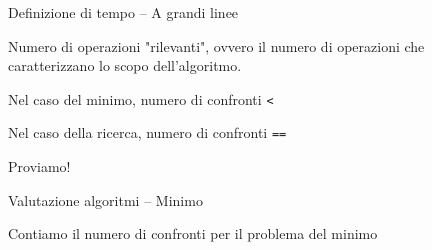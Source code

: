 \begin{frame}{Definizione di tempo -- A grandi linee}

\vspace{-9pt}
\begin{myboxtitle}
Numero di operazioni "rilevanti", ovvero il numero di operazioni che caratterizzano lo scopo dell'algoritmo.
\end{myboxtitle}

\begin{myboxtitle}[Esempio]
\BIL
\item Nel caso del minimo, numero di confronti \texttt{<}
\item Nel caso della ricerca, numero di confronti \texttt{==}
\EIL
\end{myboxtitle}

\begin{mybox}
\alert{Proviamo!}
\end{mybox}


\end{frame}


\begin{frame}[shrink=10]{Valutazione algoritmi -- Minimo}

\vspace{-9pt}
\begin{mybox}
Contiamo il numero di confronti per il problema del \alert{minimo}
\end{mybox}


\end{frame}

